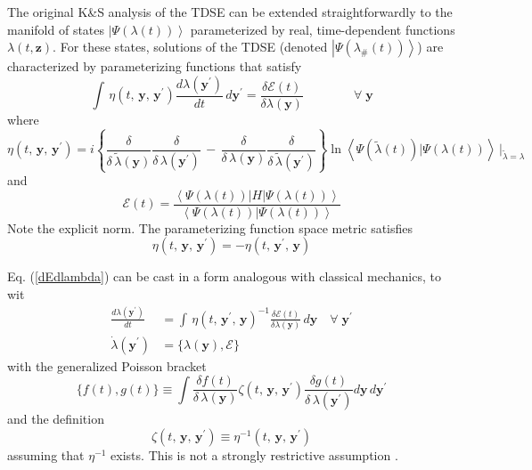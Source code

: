 \documentclass[aps,preprint]{revtex4}%
\begin{document}
The original K\&S analysis of the TDSE can be extended straightforwardly to
the manifold of states $\left|  \Psi(\lambda(t))\right\rangle $ parameterized
by real, time-dependent functions $\lambda(t,\mathbf{z})$. For these states,
solutions of the TDSE (denoted $\left|  \Psi(\lambda_{\#}(t))\right\rangle $)
are characterized by parameterizing functions that satisfy
\begin{equation}
\int\,\eta(t,\,\mathbf{y},\,\mathbf{y}^{\prime})\frac{d\lambda(\mathbf{y}%
^{\prime})}{dt}\,d\mathbf{y}^{\prime}=\frac{\delta\mathcal{E}(t)}%
{\delta\lambda(\mathbf{y})}\qquad\qquad\forall\;\mathbf{y} \label{dEdlambda}%
\end{equation}
where
\begin{equation}
\eta(t,\,\mathbf{y},\,\mathbf{y}^{\prime})=i\left\{  \frac{\delta}%
{\delta\,\tilde{\lambda}(\mathbf{y})}\frac{\delta}{\delta\,\lambda
(\mathbf{y}^{\prime})}\,-\,\frac{\delta}{\delta\,\lambda(\mathbf{y})}%
\frac{\delta}{\delta\,\tilde{\lambda}(\mathbf{y}^{\prime})}\right\}
\ln\left\langle \Psi(\tilde{\lambda}(t))|\Psi(\lambda(t))\right\rangle
\,|_{\tilde{\lambda}=\lambda} \label{eta}%
\end{equation}
and
\begin{equation}
\mathcal{E}(t)=\frac{\left\langle \Psi(\lambda(t))|H|\Psi(\lambda
(t))\right\rangle }{\left\langle \Psi(\lambda(t))|\Psi(\lambda
(t))\right\rangle } \label{Eoft}%
\end{equation}
Note the explicit norm. The parameterizing function space metric satisfies
\begin{equation}
\eta(t,\,\mathbf{y},\,\mathbf{y}^{\prime})=-\eta(t,\,\mathbf{y}^{\prime
},\,\mathbf{y})
\end{equation}


Eq. (\ref{dEdlambda}) can be cast in a form analogous with classical
mechanics, to wit
\begin{align}
\frac{d\lambda(\mathbf{y}^{\prime})}{dt}  &  =\int\,\eta(t,\,\mathbf{y}%
^{\prime},\,\mathbf{y})^{-1}\frac{\delta\mathcal{E}(t)}{\delta\lambda
(\mathbf{y})}\,d\mathbf{y}\quad\forall\;\mathbf{y}^{\prime}\nonumber\\
\dot{\lambda}(\mathbf{y}^{\prime})  &  =\{\lambda(\mathbf{y}),\mathcal{E}\}
\label{genEOM}%
\end{align}
with the generalized Poisson bracket
\begin{equation}
\{f(t),g(t)\}\equiv\int\frac{\delta f(t)}{\delta\,\lambda(\mathbf{y})}%
\zeta(t,\,\mathbf{y},\,\mathbf{y}^{\prime})\frac{\delta g(t)}{\delta
\,\lambda(\mathbf{y}^{\prime})}d\mathbf{y}\,d\mathbf{y}^{\prime}
\label{genPoisson}%
\end{equation}
and the definition
\begin{equation}
\zeta(t,\,\mathbf{y},\,\mathbf{y}^{\prime})\equiv\eta^{-1}(t,\,\mathbf{y}%
,\,\mathbf{y}^{\prime}) \label{etainverse}%
\end{equation}
assuming that $\eta^{-1}$ exists. This is not a strongly restrictive
assumption \cite{etainv}.
\end{document}
